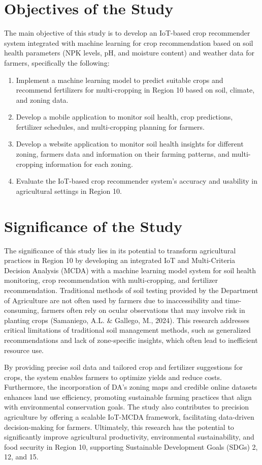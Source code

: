 {\section{Objectives of the Study}

The main objective of this study is to develop an IoT-based crop recommender system integrated with machine learning for crop recommendation based on soil health parameters (NPK levels, pH, and moisture content) and weather data for farmers, specifically the following:

\begin{enumerate}
	\item Implement a machine learning model to predict suitable crops and recommend fertilizers for multi-cropping in Region 10 based on soil, climate, and zoning data.
	\item Develop a mobile application to monitor soil health, crop predictions, fertilizer schedules, and multi-cropping planning for farmers.
	\item Develop a website application to monitor soil health insights for different zoning, farmers data and information on their farming patterns, and multi-cropping information for each zoning.
	\item Evaluate the IoT-based crop recommender system’s accuracy and  usability in agricultural settings in Region 10.
\end{enumerate}

\section{Significance of the Study}

The significance of this study lies in its potential to transform agricultural practices in Region 10 by developing an integrated IoT and Multi-Criteria Decision Analysis (MCDA) with a machine learning model system for soil health monitoring, crop recommendation with multi-cropping, and fertilizer recommendation. Traditional methods of soil testing provided by the Department of Agriculture are not often used by farmers due to inaccessibility and time-consuming, farmers often rely on ocular observations that may involve risk in planting crops (Samaniego, A.L. \& Gallego, M., 2024). This research addresses critical limitations of traditional soil management methods, such as generalized recommendations and lack of zone-specific insights, which often lead to inefficient resource use.

By providing precise soil data and tailored crop and fertilizer suggestions for crops, the system enables farmers to optimize yields and reduce costs. Furthermore, the incorporation of DA’s zoning maps and credible online datasets enhances land use efficiency, promoting sustainable farming practices that align with environmental conservation goals. The study also contributes to precision agriculture by offering a scalable IoT-MCDA framework, facilitating data-driven decision-making for farmers. Ultimately, this research has the potential to significantly improve agricultural productivity, environmental sustainability, and food security in Region 10, supporting Sustainable Development Goals (SDGs) 2, 12, and 15.

}
